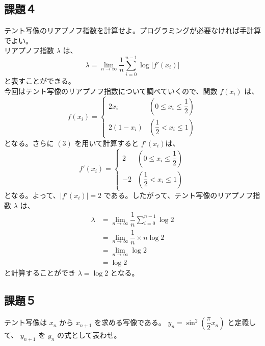 \subsection{課題４}
テント写像のリアプノフ指数を計算せよ。プログラミングが必要なければ手計算でよい。\\
リアプノフ指数 $\lambda$ は、\\
\begin{equation}
  \lambda = \lim_{n \to \infty} \dfrac{1}{n} \sum_{i = 0}^{n-1} \log |f'(x_i)|
\end{equation}
と表すことができる。\\
今回はテント写像のリアプノフ指数について調べていくので、関数 $f(x_i)$ は、
\begin{equation}
  f(x_i) =
    \begin{cases}
      2x_i & \left( 0 \leq x_i \leq \dfrac{1}{2} \right)\\
      2(1 - x_i) & \left( \dfrac{1}{2} < x_i \leq 1 \right)
    \end{cases}
\end{equation}
となる。さらに $(3)$ を用いて計算すると $f'(x_i)$は、
\begin{equation}
  f'(x_i) =
    \begin{cases}
      2 & \left( 0 \leq x_i \leq \dfrac{1}{2} \right)\\
      -2 & \left( \dfrac{1}{2} < x_i \leq 1 \right)
    \end{cases}
\end{equation}
となる。よって、$|f'(x_i)| = 2$ である。したがって、テント写像のリアプノフ指数 $\lambda$ は、
\begin{equation}
  \begin{split}
    \lambda& = \lim_{n \to \infty} \dfrac{1}{n} \sum_{i = 0}^{n-1} \log 2\\
    & = \lim_{n \to \infty} \dfrac{1}{n} \times n \log 2\\
    & = \lim_{n \to \infty} \log 2\\
    & = \log 2
  \end{split}
\end{equation}
と計算することができ $\lambda = \log 2$ となる。 

\subsection{課題５}
テント写像は $x_n$ から $x_{n+1}$ を求める写像である。 $y_n = \sin^2 \left( \dfrac{\pi}{2} x_n \right)$ と定義して、 $y_{n+1}$ を $y_n$ の式として表わせ。\\